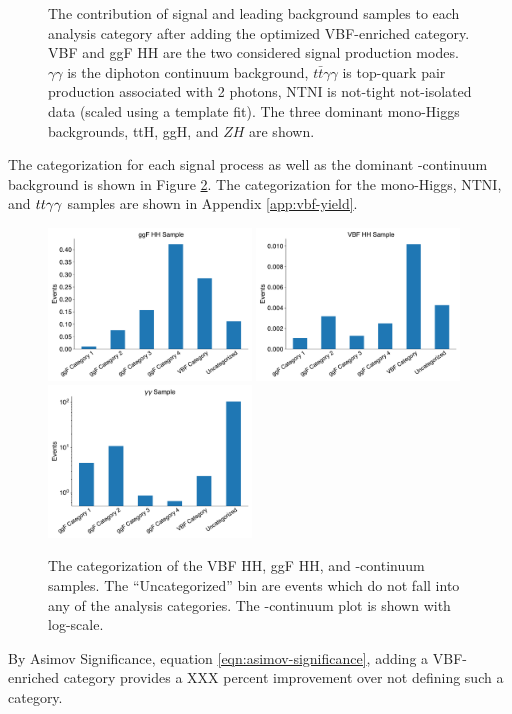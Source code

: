 \begin{figure}[p!]
  \caption[The contribution of signal and leading background samples to each analysis category after adding the optimized VBF-enriched category]{The contribution of signal and leading background samples to each analysis category after adding the optimized VBF-enriched category. VBF and ggF HH are the two considered signal production modes. $\gamma \gamma$ is the diphoton continuum background, $t\bar{t}\gamma\gamma$ is top-quark pair production associated with 2 photons, NTNI is not-tight not-isolated data (scaled using a template fit).  The three dominant mono-Higgs backgrounds, ttH, ggH, and $ZH$ are shown.}
  \label{fig:category-yields}
\end{figure}

The categorization for each signal process as well as the dominant \yy-continuum background is shown in Figure \ref{fig:process-categorization}. The categorization for the mono-Higgs, \gls{NTNI}, and $tt\gamma\gamma$ samples are shown in Appendix \ref{app:vbf-yield}.

\begin{figure}
  \centering
  \includegraphics[width=0.48\textwidth]{chapters/chapter6_vbf/images/category_breakdown/ggf_sample.pdf}
  \includegraphics[width=0.48\textwidth]{chapters/chapter6_vbf/images/category_breakdown/vbf_sample.pdf}
  \includegraphics[width=0.48\textwidth]{chapters/chapter6_vbf/images/category_breakdown/yy_sample.pdf}
  \caption[The categorization of the VBF HH, ggF HH, and \yy-continuum samples]{The categorization of the VBF HH, ggF HH, and \yy-continuum samples. The ``Uncategorized'' bin are events which do not fall into any of the analysis categories. The \yy-continuum plot is shown with log-scale.
  \label{fig:process-categorization}}
\end{figure}

By Asimov Significance, equation \ref{eqn:asimov-significance}, adding a VBF-enriched category provides a XXX percent improvement over not defining such a category.

